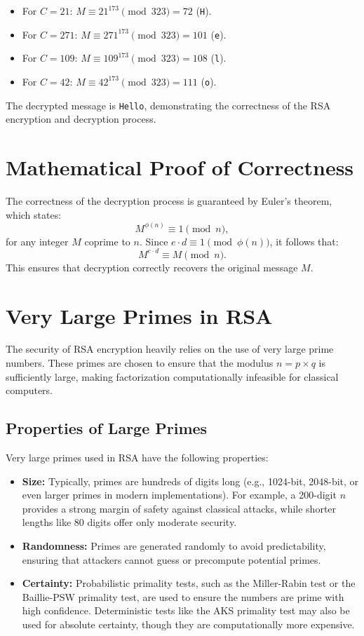 \documentclass[12pt,a4paper]{report}
\begin{document}
\begin{itemize}
    \item For \( C = 21 \): \( M \equiv 21^{173} \pmod{323} = 72 \) (\texttt{H}).
    \item For \( C = 271 \): \( M \equiv 271^{173} \pmod{323} = 101 \) (\texttt{e}).
    \item For \( C = 109 \): \( M \equiv 109^{173} \pmod{323} = 108 \) (\texttt{l}).
    \item For \( C = 42 \): \( M \equiv 42^{173} \pmod{323} = 111 \) (\texttt{o}).
\end{itemize}

The decrypted message is \texttt{Hello}, demonstrating the correctness of the RSA encryption and decryption process.

\section{Mathematical Proof of Correctness}
The correctness of the decryption process is guaranteed by Euler's theorem, which states:
\[
M^{\phi(n)} \equiv 1 \pmod{n},
\]
for any integer \( M \) coprime to \( n \). Since \( e \cdot d \equiv 1 \pmod{\phi(n)} \), it follows that:
\[
M^{e \cdot d} \equiv M \pmod{n}.
\]
This ensures that decryption correctly recovers the original message \( M \).

\section{Very Large Primes in RSA}
The security of RSA encryption heavily relies on the use of very large prime numbers. These primes are chosen to ensure that the modulus \( n = p \times q \) is sufficiently large, making factorization computationally infeasible for classical computers.

\subsection{Properties of Large Primes}
Very large primes used in RSA have the following properties:
\begin{itemize}
    \item \textbf{Size:} Typically, primes are hundreds of digits long (e.g., 1024-bit, 2048-bit, or even larger primes in modern implementations). For example, a 200-digit \( n \) provides a strong margin of safety against classical attacks, while shorter lengths like 80 digits offer only moderate security.
    \item \textbf{Randomness:} Primes are generated randomly to avoid predictability, ensuring that attackers cannot guess or precompute potential primes.
    \item \textbf{Certainty:} Probabilistic primality tests, such as the Miller-Rabin test or the Baillie-PSW primality test, are used to ensure the numbers are prime with high confidence. Deterministic tests like the AKS primality test may also be used for absolute certainty, though they are computationally more expensive.
\end{itemize}
\end{document}
